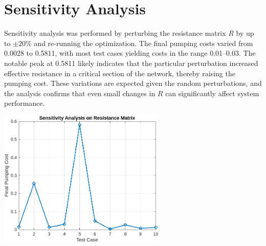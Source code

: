 \documentclass{article}
\begin{document}
\section{Sensitivity Analysis}
Sensitivity analysis was performed by perturbing the resistance matrix \(R\) by up to \(\pm 20\%\) and re-running the optimization. The final pumping costs varied from 0.0028 to 0.5811, with most test cases yielding costs in the range 0.01--0.03. The notable peak at 0.5811 likely indicates that the particular perturbation increased effective resistance in a critical section of the network, thereby raising the pumping cost. These variations are expected given the random perturbations, and the analysis confirms that even small changes in \(R\) can significantly affect system performance.


\begin{center}
\includegraphics[width=0.6\textwidth]{images/sensitivity analysis.png}
\end{center}
\end{document}
